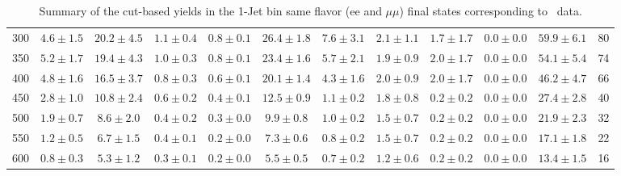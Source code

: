 \begin{table}[!ht]
{\begin{center}
\begin{tabular}{l c c c c c c c c c c c }
300 & $4.6\pm1.5$ & $20.2\pm4.5$ & $1.1\pm0.4$ & $0.8\pm0.1$ & $26.4\pm1.8$ & $7.6\pm3.1$ & $2.1\pm1.1$ & $1.7\pm1.7$ & $0.0\pm0.0$ & $59.9\pm6.1$ & 80 \\
350 & $5.2\pm1.7$ & $19.4\pm4.3$ & $1.0\pm0.3$ & $0.8\pm0.1$ & $23.4\pm1.6$ & $5.7\pm2.1$ & $1.9\pm0.9$ & $2.0\pm1.7$ & $0.0\pm0.0$ & $54.1\pm5.4$ & 74 \\
400 & $4.8\pm1.6$ & $16.5\pm3.7$ & $0.8\pm0.3$ & $0.6\pm0.1$ & $20.1\pm1.4$ & $4.3\pm1.6$ & $2.0\pm0.9$ & $2.0\pm1.7$ & $0.0\pm0.0$ & $46.2\pm4.7$ & 66 \\
450 & $2.8\pm1.0$ & $10.8\pm2.4$ & $0.6\pm0.2$ & $0.4\pm0.1$ & $12.5\pm0.9$ & $1.1\pm0.2$ & $1.8\pm0.8$ & $0.2\pm0.2$ & $0.0\pm0.0$ & $27.4\pm2.8$ & 40 \\
500 & $1.9\pm0.7$ & $8.6\pm2.0$ & $0.4\pm0.2$ & $0.3\pm0.0$ & $9.9\pm0.8$ & $1.0\pm0.2$ & $1.5\pm0.7$ & $0.2\pm0.2$ & $0.0\pm0.0$ & $21.9\pm2.3$ & 32 \\
550 & $1.2\pm0.5$ & $6.7\pm1.5$ & $0.4\pm0.1$ & $0.2\pm0.0$ & $7.3\pm0.6$ & $0.8\pm0.2$ & $1.5\pm0.7$ & $0.2\pm0.2$ & $0.0\pm0.0$ & $17.1\pm1.8$ & 22 \\
600 & $0.8\pm0.3$ & $5.3\pm1.2$ & $0.3\pm0.1$ & $0.2\pm0.0$ & $5.5\pm0.5$ & $0.7\pm0.2$ & $1.2\pm0.6$ & $0.2\pm0.2$ & $0.0\pm0.0$ & $13.4\pm1.5$ & 16 \\
\hline
\end{tabular}
\end{center}
}
\caption{Summary of the cut-based yields in the 1-Jet bin same flavor (ee and $\mu\mu$) final states corresponding to \intlumi\ data.}
\end{table}
